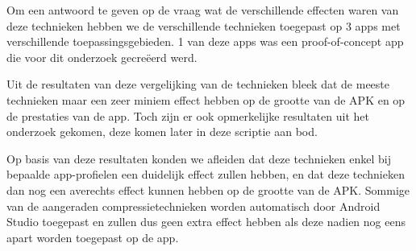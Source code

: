 Om een antwoord te geven op de vraag wat de verschillende effecten waren van deze technieken hebben we de verschillende technieken toegepast op 3 apps met verschillende toepassingsgebieden. 1 van deze apps was een proof-of-concept app die voor dit onderzoek gecreëerd werd. 

Uit de resultaten van deze vergelijking van de technieken bleek dat de meeste technieken maar een zeer miniem effect hebben op de grootte van de APK en op de prestaties van de app. Toch zijn er ook opmerkelijke resultaten uit het onderzoek gekomen, deze komen later in deze scriptie aan bod.

Op basis van deze resultaten konden we afleiden dat deze technieken enkel bij bepaalde app-profielen een duidelijk effect zullen hebben, en dat deze technieken dan nog een averechts effect kunnen hebben op de grootte van de APK. Sommige van de aangeraden compressietechnieken worden automatisch door Android Studio toegepast en zullen dus geen extra effect hebben als deze nadien nog eens apart worden toegepast op de app.